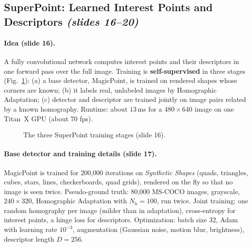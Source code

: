 \documentclass[11pt,a4paper]{article}
\newcommand{\slr}[1]{\texorpdfstring{\emph{(slides #1)}}{(slides #1)}}
\theoremstyle{definition}
\theoremstyle{plain}
\theoremstyle{remark}
\begin{document}
\subsection{SuperPoint: Learned Interest Points and Descriptors \slr{16--20}}
\paragraph{Idea (slide 16).} A fully convolutional network computes interest points and their descriptors in one forward pass over the
full image. Training is \textbf{self-supervised} in three stages (Fig.~\ref{fig:sp3}): (a) a base detector, MagicPoint, is trained on rendered
shapes whose corners are known; (b) it labels real, unlabeled images by Homographic Adaptation; (c) detector and descriptor are trained jointly on
image pairs related by a known homography. Runtime: about $13$\,ms for a $480\times640$ image on one Titan~X GPU (about 70 fps).

\begin{figure}[H]
\centering
{}
\caption{The three SuperPoint training stages (slide 16).}\label{fig:sp3}
\end{figure}

\paragraph{Base detector and training details (slide 17).}
MagicPoint is trained for 200,000 iterations on \emph{Synthetic Shapes} (quads, triangles, cubes, stars, lines, checkerboards, quad grids),
rendered on the fly so that no image is seen twice. Pseudo-ground truth: 80,000 MS-COCO images, grayscale, $240\times320$, Homographic
Adaptation with $N_h=100$, run twice. Joint training: one random homography per image (milder than in adaptation), cross-entropy for interest
points, a hinge loss for descriptors. Optimization: batch size 32, Adam with learning rate $10^{-3}$, augmentation (Gaussian noise, motion blur,
brightness), descriptor length $D=256$.
\end{document}
